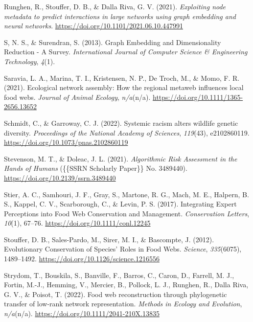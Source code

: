 \documentclass[10pt,oneside]{article}
\newlength{\cslhangindent}
\newenvironment{CSLReferences}[2] %
 {%
  \setlength{\parindent}{0pt}
  \ifodd #1 \everypar{\setlength{\hangindent}{\cslhangindent}}\ignorespaces\fi
  \ifnum #2 > 0
  \setlength{\parskip}{#2\baselineskip}
  \fi
 }%
 {}
\begin{document}
\begin{CSLReferences}{1}{0}
\leavevmode{}%
Runghen, R., Stouffer, D. B., \& Dalla Riva, G. V. (2021).
\emph{Exploiting node metadata to predict interactions in large networks
using graph embedding and neural networks}.
\url{https://doi.org/10.1101/2021.06.10.447991}

\leavevmode{}%
S, N. S., \& Surendran, S. (2013). Graph Embedding and Dimensionality
Reduction - A Survey. \emph{International Journal of Computer Science \&
Engineering Technology}, \emph{4}(1).

\leavevmode{}%
Saravia, L. A., Marina, T. I., Kristensen, N. P., De Troch, M., \& Momo,
F. R. (2021). Ecological network assembly: How the regional metaweb
influences local food webs. \emph{Journal of Animal Ecology},
\emph{n/a}(n/a). \url{https://doi.org/10.1111/1365-2656.13652}

\leavevmode{}%
Schmidt, C., \& Garroway, C. J. (2022). Systemic racism alters wildlife
genetic diversity. \emph{Proceedings of the National Academy of
Sciences}, \emph{119}(43), e2102860119.
\url{https://doi.org/10.1073/pnas.2102860119}

\leavevmode{}%
Stevenson, M. T., \& Doleac, J. L. (2021). \emph{Algorithmic Risk
Assessment in the Hands of Humans} (\{\{SSRN Scholarly Paper\}\} No.
3489440). \url{https://doi.org/10.2139/ssrn.3489440}

\leavevmode{}%
Stier, A. C., Samhouri, J. F., Gray, S., Martone, R. G., Mach, M. E.,
Halpern, B. S., Kappel, C. V., Scarborough, C., \& Levin, P. S. (2017).
Integrating Expert Perceptions into Food Web Conservation and
Management. \emph{Conservation Letters}, \emph{10}(1), 67--76.
\url{https://doi.org/10.1111/conl.12245}

\leavevmode{}%
Stouffer, D. B., Sales-Pardo, M., Sirer, M. I., \& Bascompte, J. (2012).
Evolutionary Conservation of Species' Roles in Food Webs.
\emph{Science}, \emph{335}(6075), 1489--1492.
\url{https://doi.org/10.1126/science.1216556}

\leavevmode{}%
Strydom, T., Bouskila, S., Banville, F., Barros, C., Caron, D., Farrell,
M. J., Fortin, M.-J., Hemming, V., Mercier, B., Pollock, L. J., Runghen,
R., Dalla Riva, G. V., \& Poisot, T. (2022). Food web reconstruction
through phylogenetic transfer of low-rank network representation.
\emph{Methods in Ecology and Evolution}, \emph{n/a}(n/a).
\url{https://doi.org/10.1111/2041-210X.13835}


\end{CSLReferences}
\end{document}
